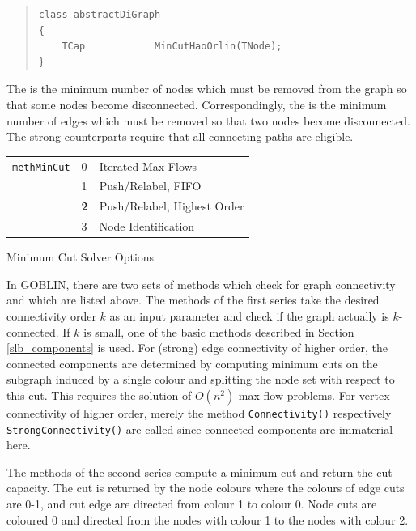 \documentclass[a4paper,11pt,twoside]{book}
\begin{document}
\begin{multicols}{2}
\begin{quote}
\begin{verbatim}
class abstractDiGraph
{
    TCap            MinCutHaoOrlin(TNode);
}
\end{verbatim}
\end{quote}
The  is the minimum number of nodes which
must be removed from the graph so that some nodes become disconnected.
Correspondingly, the  is the minimum number of
edges which must be removed so that two nodes become disconnected.
The strong counterparts require that all connecting paths are eligible.

\begin{tablehere}
\begin{center}
\vspace*{1cm}
\begin{tabular}{|l|l|l|}
\hline
\verb/methMinCut/   & 0 & Iterated Max-Flows \\
                    & 1 & Push/Relabel, FIFO \\
                    & {\bf 2} & Push/Relabel, Highest Order \\
                    & 3 & Node Identification \\
\hline
\end{tabular}
\end{center}
\caption{\label{tlb_mincut}Minimum Cut Solver Options}
\end{tablehere}

\noindent
In GOBLIN, there are two sets of methods which check for graph connectivity
and which are listed above. The methods of the first series take the desired
connectivity order $k$ as an input parameter and check if the graph actually
is $k$-connected. If $k$ is small, one of the basic methods described in
Section \ref{slb_components} is used. For (strong) edge connectivity of higher
order, the connected components are determined by computing minimum cuts on
the subgraph induced by a single colour and splitting the node set with respect
to this cut. This requires the solution of $O(n^2)$ max-flow problems.
For vertex connectivity of higher order, merely the method \verb/Connectivity()/
respectively \verb/StrongConnectivity()/ are called since connected components
are immaterial here.

The methods of the second series compute a minimum cut and return the cut
capacity. The cut is returned by the node colours where the colours of edge
cuts are 0-1, and cut edge are directed from colour 1 to colour 0. Node cuts
are coloured 0 and directed from the nodes with colour 1 to the nodes with
colour 2.


\end{multicols}
\end{document}
